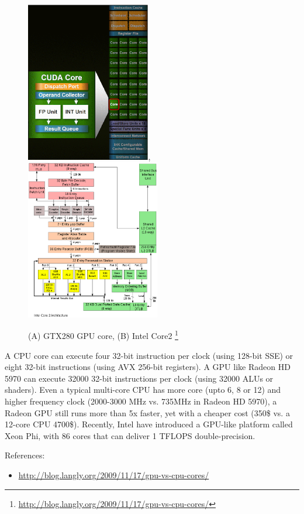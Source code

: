 \begin{figure}[hbt]
  \centerline{\includegraphics[height=7cm,
    angle=0]{./images/gpu_core.eps},\includegraphics[height=7cm,
    angle=0]{./images/core2_intel.eps}}
 \caption{(A) GTX280 GPU core, (B) Intel Core2
 \footnote{\url{http://blog.langly.org/2009/11/17/gpu-vs-cpu-cores/}}}
\label{fig:gpu.cpu_core}
\end{figure}

A CPU core can execute four 32-bit instruction per clock (using 128-bit SSE) or
eight 32-bit instructions (using AVX 256-bit registers). A GPU like Radeon HD
5970 can execute 32000 32-bit instructions per clock (using 32000 ALUs or
shaders). Even a typical multi-core CPU has more core (upto 6, 8 or 12) and
higher frequency clock (2000-3000 MHz vs. 735MHz in Radeon HD 5970), a Radeon
GPU still runs more than 5x faster, yet with a cheaper cost (350\$ vs. a
12-core CPU 4700\$). Recently, Intel have introduced a GPU-like platform called
Xeon Phi, with 86 cores that can deliver 1 TFLOPS double-precision.

References:
\begin{itemize}
\item \url{http://blog.langly.org/2009/11/17/gpu-vs-cpu-cores/}
\end{itemize}



